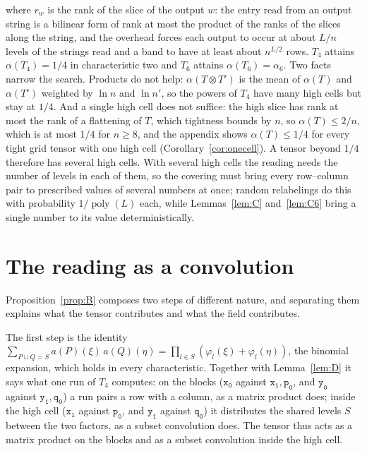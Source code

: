 \documentclass[11pt]{article}
\theoremstyle{definition}
\theoremstyle{remark}
\newcommand{\tl}[1]{\mathtt{#1}}
\DeclareMathOperator{\poly}{poly}
\begin{document}
where $r_w$ is the rank of the slice of the output $w$: the entry read from an output string is a bilinear form of rank at most the product of the ranks of the slices along the string, and the overhead forces each output to occur at about $L/n$ levels of the strings read and a band to have at least about $n^{L/2}$ rows. $T_4$ attains $\alpha(T_4)=1/4$ in characteristic two and $T_6$ attains $\alpha(T_6)=\alpha_6$. Two facts narrow the search. Products do not help: $\alpha(T\otimes T')$ is the mean of $\alpha(T)$ and $\alpha(T')$ weighted by $\ln n$ and $\ln n'$, so the powers of $T_4$ have many high cells but stay at $1/4$. And a single high cell does not suffice: the high slice has rank at most the rank of a flattening of $T$, which tightness bounds by $n$, so $\alpha(T)\le2/n$, which is at most $1/4$ for $n\ge8$, and the appendix shows $\alpha(T)\le1/4$ for every tight grid tensor with one high cell (Corollary~\ref{cor:onecell}). A tensor beyond $1/4$ therefore has several high cells. With several high cells the reading needs the number of levels in each of them, so the covering must bring every row--column pair to prescribed values of several numbers at once; random relabelings do this with probability $1/\poly(L)$ each, while Lemmas~\ref{lem:C} and~\ref{lem:C6} bring a single number to its value deterministically.

\section{The reading as a convolution}\label{sec:conv}

Proposition~\ref{prop:B} composes two steps of different nature, and separating them explains what the tensor contributes and what the field contributes.

The first step is the identity $\sum_{P\sqcup Q=S}a(P)(\xi)\,a(Q)(\eta)=\prod_{l\in S}(\varphi_l(\xi)+\varphi_l(\eta))$, the binomial expansion, which holds in every characteristic. Together with Lemma~\ref{lem:D} it says what one run of $T_4$ computes: on the blocks ($\tl{x_0}$ against $\tl{x_1},\tl{p_0}$, and $\tl{y_0}$ against $\tl{y_1},\tl{q_0}$) a run pairs a row with a column, as a matrix product does; inside the high cell ($\tl{x_1}$ against $\tl{p_0}$, and $\tl{y_1}$ against $\tl{q_0}$) it distributes the shared levels $S$ between the two factors, as a subset convolution does. The tensor thus acts as a matrix product on the blocks and as a subset convolution inside the high cell.
\end{document}
